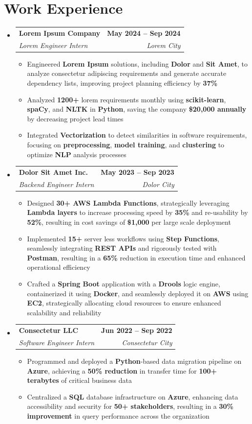 \documentclass[letterpaper,11pt]{article}
\makeatletter
\newcommand{\resumeItem}[1]{
  \item\small{
    {#1 \vspace{0pt}}
  }
}
\newcommand{\resumeSubheading}[4]{
  \vspace{-2pt}\item
    \begin{tabular*}{1.0\textwidth}[t]{l@{\extracolsep{\fill}}r}
      \textbf{#1} & \textbf{\small #2} \\
      \textit{\small#3} & \textit{\small #4} \\
    \end{tabular*}\vspace{-7pt}
}
\newcommand{\resumeSubHeadingListStart}{\begin{itemize}[leftmargin=0.0in, label={}]}
\newcommand{\resumeSubHeadingListEnd}{\end{itemize}}\vspace{0pt}
\newcommand{\resumeItemListStart}{\begin{itemize}}
\newcommand{\resumeItemListEnd}{\end{itemize}\vspace{-5pt}}
\makeatother
\begin{document}
\section{Work Experience}
    \resumeSubHeadingListStart
                \resumeSubheading{Lorem Ipsum Company}{May 2024 -- Sep 2024}{Lorem Engineer Intern}{Lorem City} 
                \resumeItemListStart
                    \resumeItem{Engineered \textbf{Lorem Ipsum} solutions, including \textbf{Dolor} and \textbf{Sit Amet}, to analyze consectetur adipiscing requirements and generate accurate dependency lists, improving project planning efficiency by \textbf{37\%}}
                    \resumeItem{Analyzed \textbf{1200+} lorem requirements monthly using \textbf{scikit-learn}, \textbf{spaCy}, and \textbf{NLTK} in \textbf{Python}, saving the company \textbf{\$20,000 annually} by decreasing project lead times}
                    \resumeItem{Integrated \textbf{Vectorization} to detect similarities in software requirements, focusing on \textbf{preprocessing}, \textbf{model training}, and \textbf{clustering} to optimize \textbf{NLP} analysis processes}
                    \resumeItemListEnd
            \resumeSubheading{Dolor Sit Amet Inc.}{May 2023 -- Sep 2023}{Backend Engineer Intern}{Dolor City} 
                \resumeItemListStart
                    \resumeItem{Designed \textbf{30+ AWS Lambda Functions}, strategically leveraging \textbf{Lambda layers} to increase processing speed by \textbf{35\%} and re-usability by \textbf{52\%}, resulting in cost savings of \textbf{\$1,000} per large scale deployment}
                    \resumeItem{Implemented \textbf{15+} server less workflows using \textbf{Step Functions}, seamlessly integrating \textbf{REST APIs} and rigorously tested with \textbf{Postman},  resulting in a \textbf{65\%} reduction in execution time and enhanced operational efficiency}
                    \resumeItem{Crafted a \textbf{Spring Boot} application with a \textbf{Drools} logic engine, containerized it using \textbf{Docker}, and seamlessly deployed it on \textbf{AWS} using \textbf{EC2}, strategically allocating cloud resources to ensure enhanced scalability and reliability}
                    \resumeItemListEnd
            \resumeSubheading{Consectetur LLC}{Jun 2022 -- Sep 2022}{Software Engineer Intern}{Consectetur City}
                \resumeItemListStart
                    \resumeItem{Programmed and deployed a \textbf{Python}-based data migration pipeline on \textbf{Azure}, achieving a \textbf{50\% reduction} in transfer time for \textbf{100+ terabytes} of critical business data}
                    \resumeItem{Centralized a \textbf{SQL} database infrastructure on \textbf{Azure}, enhancing data accessibility and security for \textbf{50+ stakeholders}, resulting in a \textbf{30\% improvement} in query performance across the organization}
                    \resumeItemListEnd
    \resumeSubHeadingListEnd
    \vspace{-12pt}
\end{document}

